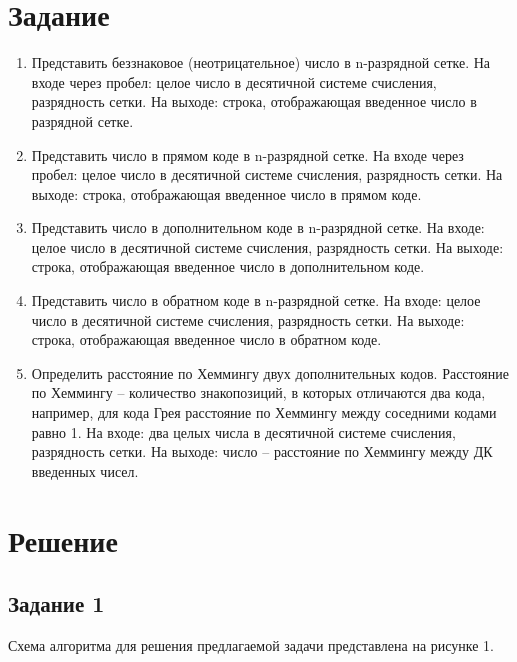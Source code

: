 \documentclass[a4paper,14pt]{extarticle}
\begin{document}
	\section*{Задание}
	\begin{enumerate}
		\item Представить беззнаковое (неотрицательное) число в n-разрядной сетке. На входе через пробел: целое число в десятичной системе счисления, разрядность сетки. На выходе: строка, отображающая введенное число в разрядной сетке.
		
		\item  Представить число в прямом коде в n-разрядной сетке. На входе через пробел: целое число в десятичной системе счисления, разрядность сетки. На выходе: строка, отображающая введенное число в прямом коде.
		
		\item Представить число в дополнительном коде в n-разрядной сетке. На входе: целое число в десятичной системе счисления, разрядность сетки. На выходе: строка, отображающая введенное число в дополнительном коде.
		
		\item Представить число в обратном коде в n-разрядной сетке. На входе: целое число в десятичной системе счисления, разрядность сетки. На выходе: строка, отображающая введенное число в обратном коде.
		
		\item Определить расстояние по Хеммингу двух дополнительных кодов. Расстояние по Хеммингу -- количество знакопозиций, в которых отличаются два кода, например, для кода Грея расстояние по Хеммингу между соседними кодами равно 1. На входе: два целых числа в десятичной системе счисления, разрядность сетки. На выходе: число -- расстояние по Хеммингу между ДК введенных чисел.
	\end{enumerate}
	
	\section*{Решение}
	\subsection*{Задание 1}
	Схема алгоритма для решения предлагаемой задачи представлена на рисунке 1.
\end{document}
